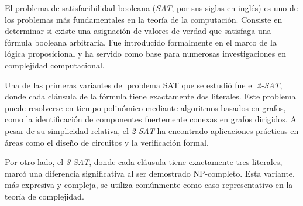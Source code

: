\documentclass{article}
\begin{document}
El problema de satisfacibilidad booleana (\textit{SAT}, por sus siglas en inglés)
es uno de los problemas más fundamentales en la teoría de la computación.
Consiste en determinar si existe una asignación de valores de verdad que satisfaga una fórmula booleana arbitraria.
Fue introducido formalmente en el marco de la lógica proposicional y ha servido como base para numerosas investigaciones
en complejidad computacional.

Una de las primeras variantes del problema SAT que se estudió fue el \textit{2-SAT}, donde cada cláusula de la fórmula
tiene exactamente dos literales. Este problema puede resolverse en tiempo polinómico mediante algoritmos basados en grafos,
como la identificación de componentes fuertemente conexas en grafos dirigidos. A pesar de su simplicidad relativa,
el \textit{2-SAT} ha encontrado aplicaciones prácticas en áreas como el diseño de circuitos y la verificación formal.

Por otro lado, el \textit{3-SAT}, donde cada cláusula tiene exactamente tres literales,
marcó una diferencia significativa al ser demostrado NP-completo. Esta variante, más expresiva y compleja,
se utiliza comúnmente como caso representativo en la teoría de complejidad.
\end{document}
